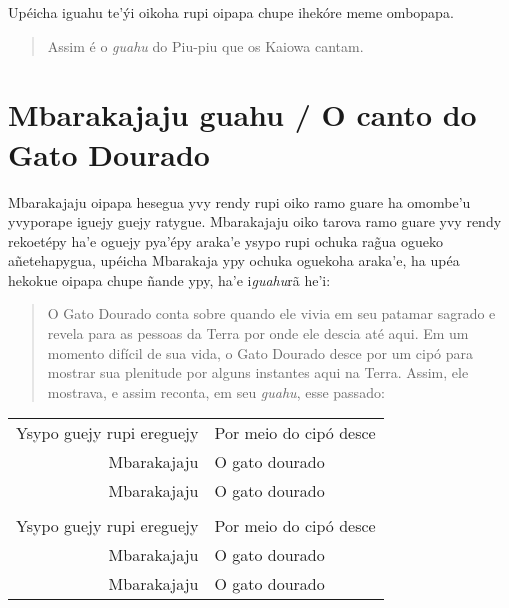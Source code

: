 Upéicha iguahu te'ýi oikoha rupi oipapa chupe ihekóre meme ombopapa.

\begin{quote}
Assim é o \emph{guahu} do Piu-piu que os Kaiowa cantam.
\end{quote}

\chapter{Mbarakajaju guahu / O canto do Gato Dourado}

Mbarakajaju oipapa hesegua yvy rendy rupi oiko ramo guare ha omombe'u
yvyporape iguejy guejy ratygue. Mbarakajaju oiko tarova ramo guare yvy
rendy rekoetépy ha'e oguejy pya'épy araka'e ysypo rupi ochuka rag̃ua
ogueko añetehapygua, upéicha Mbarakaja ypy ochuka oguekoha araka'e, ha
upéa hekokue oipapa chupe ñande ypy, ha'e i\emph{guahu}rã he'i:

\begin{quote}
O Gato Dourado conta sobre quando ele vivia em seu patamar sagrado e
revela para as pessoas da Terra por onde ele descia até aqui. Em um
momento difícil de sua vida, o Gato Dourado desce por um cipó para
mostrar sua plenitude por alguns instantes aqui na Terra. Assim, ele
mostrava, e assim reconta, em seu \emph{guahu}, esse passado:
\end{quote}



\begin{table}[]
\begin{tabular}{rl}
Ysypo guejy rupi ereguejy          & Por meio do cipó desce           \\
Mbarakajaju\footnotemark{}          & O gato dourado           \\
Mbarakajaju 		& O gato dourado \\
                  &                     \\
Ysypo guejy rupi ereguejy          & Por meio do cipó desce           \\
Mbarakajaju          & O gato dourado           \\
Mbarakajaju          & O gato dourado           \\
\end{tabular}
\end{table}






